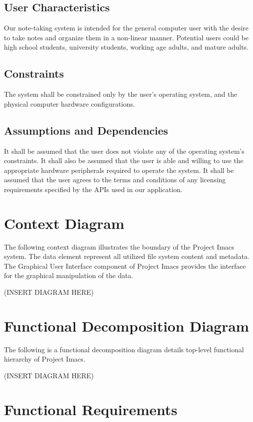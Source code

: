 \documentclass{article}
\begin{document}
\subsection{User Characteristics}
Our note-taking system is intended for the general computer user with the desire to take notes and organize them in a non-linear manner. Potential users could be high school students, university students, working age adults, and mature adults.

\subsection{Constraints}
The system shall be constrained only by the user's operating system, and the physical computer hardware configurations.

\subsection{Assumptions and Dependencies}
It shall be assumed that the user does not violate any of the operating system's constraints. It shall also be assumed that the user is able and willing to use the appropriate hardware peripherals required to operate the system.
It shall be assumed that the user agrees to the terms and conditions of any licensing requirements specified by the APIs used in our application.

\section{Context Diagram}
The following context diagram illustrates the boundary of the Project Imacs system. The data element represent all utilized file system content and metadata. The Graphical User Interface component of Project Imacs provides the interface for the graphical manipulation of the data.

(INSERT DIAGRAM HERE)

\section{Functional Decomposition Diagram}
The following is a functional decomposition diagram details top-level functional hierarchy of Project Imacs.

(INSERT DIAGRAM HERE)

\section{Functional Requirements}
\end{document}

